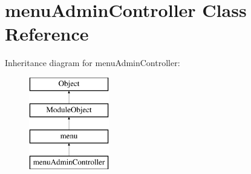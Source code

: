 \hypertarget{classmenuAdminController}{}\section{menu\+Admin\+Controller Class Reference}
\label{classmenuAdminController}
Inheritance diagram for menu\+Admin\+Controller\+:\begin{figure}[H]
\begin{center}
\leavevmode
\includegraphics[height=4.000000cm]{classmenuAdminController}
\end{center}
\end{figure}
